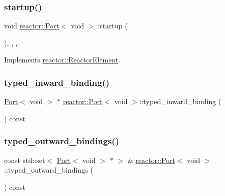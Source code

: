 \subsubsection{\texorpdfstring{startup()}{startup()}}
{\footnotesize\ttfamily void \hyperlink{classreactor_1_1Port}{reactor\+::\+Port}$<$ void $>$\+::startup (\begin{DoxyParamCaption}{ }\end{DoxyParamCaption})\hspace{0.3cm}{\ttfamily [inline]}, {\ttfamily [final]}, {\ttfamily [override]}, {\ttfamily [virtual]}}



Implements \hyperlink{classreactor_1_1ReactorElement_a8cb574cb20ff963903ad905fb0a157e3}{reactor\+::\+Reactor\+Element}.

\mbox{\label{classreactor_1_1Port_3_01void_01_4_aa50594b9d98fa93219adf8330ed76131}} 
\subsubsection{\texorpdfstring{typed\+\_\+inward\+\_\+binding()}{typed\_inward\_binding()}}
{\footnotesize\ttfamily \hyperlink{classreactor_1_1Port}{Port}$<$ void $>$ $\ast$ \hyperlink{classreactor_1_1Port}{reactor\+::\+Port}$<$ void $>$\+::typed\+\_\+inward\+\_\+binding (\begin{DoxyParamCaption}{ }\end{DoxyParamCaption}) const}

\mbox{\label{classreactor_1_1Port_3_01void_01_4_a8f9bdc0b6bace7d1a05615b28cf43717}} 
\subsubsection{\texorpdfstring{typed\+\_\+outward\+\_\+bindings()}{typed\_outward\_bindings()}}
{\footnotesize\ttfamily const std\+::set$<$ \hyperlink{classreactor_1_1Port}{Port}$<$ void $>$ $\ast$ $>$ \& \hyperlink{classreactor_1_1Port}{reactor\+::\+Port}$<$ void $>$\+::typed\+\_\+outward\+\_\+bindings (\begin{DoxyParamCaption}{ }\end{DoxyParamCaption}) const}



